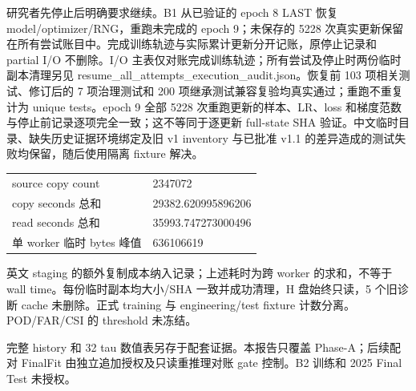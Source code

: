 \documentclass[UTF8,11pt,fontset=windows]{ctexart}
\begin{document}
研究者先停止后明确要求继续。B1 从已验证的 epoch 8 LAST 恢复 model/optimizer/RNG，重跑未完成的 epoch 9；未保存的 5228 次真实更新保留在所有尝试账目中。完成训练轨迹与实际累计更新分开记账，原停止记录和 partial I/O 不删除。I/O 主表仅对账完成训练轨迹；所有尝试及停止时两份临时副本清理另见 resume\_all\_attempts\_execution\_audit.json。恢复前 103 项相关测试、修订后的 7 项治理测试和 200 项继承测试兼容复验均真实通过；重跑不重复计为 unique tests。epoch 9 全部 5228 次重跑更新的样本、LR、loss 和梯度范数与停止前记录逐项完全一致；这不等同于逐更新 full-state SHA 验证。中文临时目录、缺失历史证据环境绑定及旧 v1 inventory 与已批准 v1.1 的差异造成的测试失败均保留，随后使用隔离 fixture 解决。

\begin{tabularx}{\textwidth}{@{}p{41mm}Y@{}}\toprule
source copy count & 2347072 \\
copy seconds 总和 & 29382.620995896206 \\
read seconds 总和 & 35993.747273000496 \\
单 worker 临时 bytes 峰值 & 636106619 \\
\bottomrule\end{tabularx}

英文 staging 的额外复制成本纳入记录；上述耗时为跨 worker 的求和，不等于 wall time。每份临时副本均大小/SHA 一致并成功清理，H 盘始终只读，5 个旧诊断 cache 未删除。正式 training 与 engineering/test fixture 计数分离。POD/FAR/CSI 的 threshold 未冻结。

完整 history 和 32 tau 数值表另存于配套证据。本报告只覆盖 Phase-A；后续配对 FinalFit 由独立追加授权及只读重推理对账 gate 控制。B2 训练和 2025 Final Test 未授权。
\end{document}
